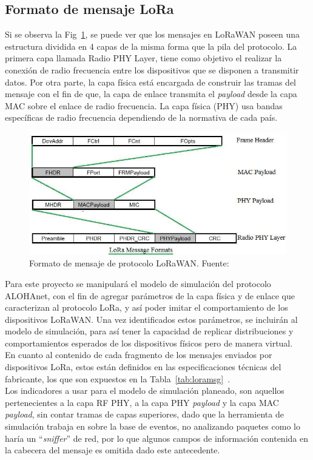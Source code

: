 \begin{justify}
\subsection{Formato de mensaje LoRa}
Si se observa la Fig~\ref{fig:msg}, se puede ver que los mensajes en LoRaWAN poseen una estructura dividida en 4 capas de la misma forma que la pila del protocolo. La primera capa llamada Radio PHY Layer, tiene como objetivo el realizar la conexión de radio frecuencia entre los dispositivos que se disponen a transmitir datos. Por otra parte, la capa física está encargada de construir las tramas del mensaje con el fin de que, la capa de enlace transmita el \textit{payload} desde la capa MAC sobre el enlace de radio frecuencia. La capa física (PHY) usa bandas específicas de radio frecuencia dependiendo de la normativa de cada país\cite{Sornin}.\\
\begin{figure}[!ht]
\includegraphics[scale=0.4]{images/LoRa-message-formats}
\caption{Formato de mensaje de protocolo LoRaWAN. Fuente:~\cite{Sornin}}
\label{fig:msg}
\end{figure}
\noindent
Para este proyecto se manipulará el modelo de simulación del protocolo ALOHAnet, con el fin de agregar parámetros de la capa física y de enlace que caracterizan al protocolo LoRa, y así poder imitar el comportamiento de los dispositivos LoRaWAN. Una vez identificados estos parámetros, se incluirán al modelo de simulación, para así tener la capacidad de replicar distribuciones y comportamientos esperados de los dispositivos físicos pero de manera virtual.\\
En cuanto al contenido de cada fragmento de los mensajes enviados por dispositivos LoRa, estos están definidos en las especificaciones técnicas del fabricante, los que son expuestos en la Tabla~\ref{tab:loramsg}~\cite{Sornin}.\\
Los indicadores a usar para el modelo de simulación planeado, son aquellos pertenecientes a la capa RF PHY, a la capa PHY \textit{payload} y la capa MAC \textit{payload}, sin contar tramas de capas superiores, dado que la herramienta de simulación trabaja en sobre la base de eventos, no analizando paquetes como lo haría un ``\textit{sniffer}'' de red, por lo que algunos campos de información contenida en la cabecera del mensaje es omitida dado este antecedente.

\end{justify}
